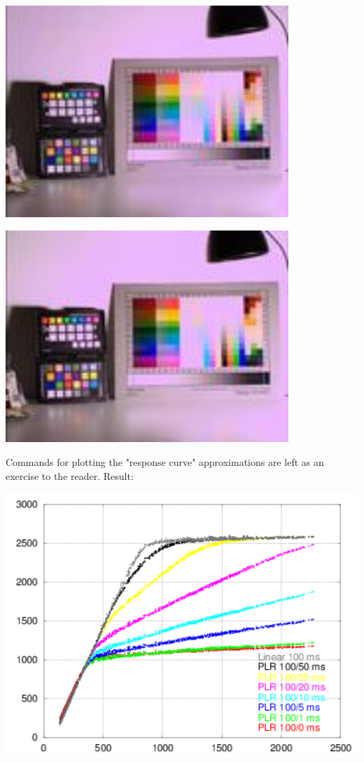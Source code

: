 \begin{center}
\includegraphics[height=8cm]{images/100ms-35ms-32-tiny}
\end{center}

\begin{center}
\includegraphics[height=8cm]{images/100ms-50ms-32-tiny}
\end{center}

Commands for plotting the "response curve" approximations are left as an exercise to the reader. Result: 

\begin{center}
\includegraphics[height=10cm]{images/100-x-32-plr-vs-30ms-lin}
\end{center}

